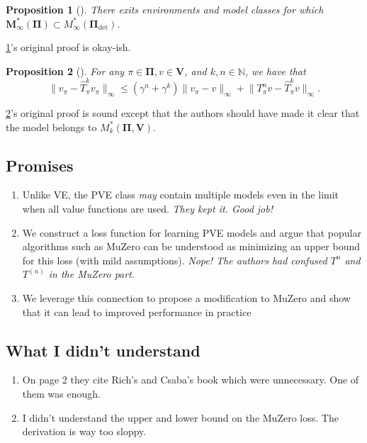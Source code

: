 \documentclass[a4paper]{article}
\theoremstyle{definition}
\theoremstyle{remark}
\theoremstyle{plain}
\newtheorem{proposition}{Proposition}
\newcommand{\bM}{\mathbf{M}}
\newcommand{\bV}{\mathbf{V}}
\newcommand{\bPi}{\mathbf{\Pi}}
\newcommand{\N}{\mathbb{N}}
\begin{document}
\begin{proposition}[{\normalfont\citet[Proposition 5]{grimm2021proper}}]
    \label{prpstn:det-plcy-is-engh}
    There exits environments and model classes for which $\bM_\infty^*(\bPi) \subset M_\infty^*(\bPi_\mathrm{det})$. 
\end{proposition}
\cref{prpstn:det-plcy-is-engh}'s original proof is okay-ish.

\begin{proposition}[{\normalfont\citet[Proposition 6]{grimm2021proper}}]
    \label{prpstn:pve-dstnc}
    For any $\pi \in \bPi, v \in \bV$, and $k, n \in \N$, we have that
    \begin{equation*}
        \lVert v_\pi - \hat{T}^k_\pi v_\pi \rVert_\infty \leq (\gamma^n + \gamma^k)\lVert v_\pi - v \rVert_\infty + \lVert T^n_\pi v - \hat{T}^k_\pi v \rVert_\infty.
    \end{equation*}
\end{proposition}
\cref{prpstn:pve-dstnc}'s original proof is sound except that the authors should have made it clear that the model belongs to $M_k^*(\bPi, \bV)$.



\subsection{Promises}
\begin{enumerate}[label=(\Alph*)]
    \item Unlike VE, the PVE class \emph{may} contain multiple models even in the limit when all value functions are used. \emph{They kept it. Good job!}

    \item We construct a loss function for learning PVE models and argue that popular algorithms such as MuZero can be understood as minimizing an upper bound for this loss (with mild assumptions). \emph{Nope! The authors had confused $T^n$ and $T^(n)$ in the MuZero part.}

    \item We leverage this connection to propose a modification to MuZero and show that it can lead to improved performance in practice
\end{enumerate}

\subsection{What I didn't understand}
    \begin{enumerate}[label=(\Alph*)]
        \item On page 2 they cite Rich's and Csaba's book which were unnecessary. One of them was enough.

        \item I didn't understand the upper and lower bound on the MuZero loss. The derivation is way too sloppy.
        
    \end{enumerate}
\end{document}
